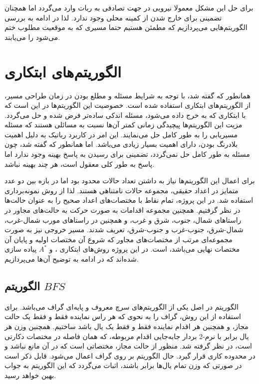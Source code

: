 برای حل این مشکل معمولا نیرویی در جهت تصادفی به ربات وارد می‌گردد اما همچنان تضمینی برای خارج شدن از کمینه محلی وجود ندارد. لذا در ادامه به بررسی الگوریتم‌هایی می‌پردازیم که مطمئن هستیم حتما مسیری که به موقعیت مطلوب ختم می‌شود را می‌یابند.

\section{الگوریتم‌های ابتکاری}
همانطور که گفته شد، با توجه به شرایط مسئله و مطلع بودن در زمان طراحی مسیر، از الگوریتم‌های ابتکاری استفاده شده است. خصوصیت این الگوریتم‌ها در این است که با ابتکاری که به خرج داده می‌شود، مسئله اندکی ساده‌تر فرض شده و حل می‌گردد. مزیت این الگوریتم‌ها پیچیدگی زمانی کمتر آن‌ها نسبت به مسائلی هستند که مسئله مسیریابی را به طور کامل حل می‌نمایند. این امر در کاربرد رباتیک به دلیل اهمیت بلادرنگ بودن، دارای اهمیت بسیار زیادی می‌باشد. اما همانطور که گفته شد، چون مسئله به طور کامل حل نمی‌گردد، تضمینی برای رسیدن به پاسخ بهینه وجود ندارد اما پاسخ به طور کلی معقول است، هر چند بهینه نباشد.

برای اعمال این الگوریتم‌ها نیاز به داشتن تعداد حالات محدود بود اما در بازه بین دو عدد متمایز در اعداد حقیقی، مجموعه حالات نامتناهی هستند. لذا از روش نمونه‌برداری استفاده شد. در این پروژه، تمام نقاط با مختصات‌های اعداد صحیح را به عنوان حالت‌ها در نظر گرفتیم. همچنین مجموعه اقدامات به صورت حرکت به حالت‌های مجاور در راستاهای شمال، جنوب، شرق و غرب، و همچنین در راستاهای مورب شمال-غرب، شمال-شرق، جنوب-غرب و جنوب-شرق، تعریف شدند. مسیر خروجی نیز به صورت مجموعه‌ای مرتب از مختصات‌های مجاور که شروع آن مختصات اولیه و پایان آن مختصات نهایی می‌باشد، است. در این پروژه روش‌های ابتکاری ،  و $A^*$ پیاده سازی شده‌اند که در ادامه به توضیح آن‌ها می‌پردازیم.

\subsection{الگوریتم $BFS$}
الگوریتم  در اصل یکی از الگوریتم‌های سرچ معروف و پایه‌ای گراف می‌باشد. برای استفاده از این روش، گراف را به نحوی که هر راس نماینده فقط و فقط یک حالت مجاز، و همچنین هر اقدام نماینده فقط و فقط یک یال باشد ساختیم. همچنین وزن هر یال برابر با نرم-2 بردار جابه‌جایی اقدام مربوطه، که همان فاصله در مختصات دکارتی است، در نظر گرفته شد. منظور از حالت مجاز، مختصاتی است که در آن مانع نباشد و در محدوده کاری قرار گیرد. حال الگوریتم  بر روی گراف اعمال می‌شود. قابل ذکر است در صورتی که وزن تمام یال‌ها برابر باشند، اثبات می‌گردد که این الگوریتم به جواب بهین خواهد رسید.

